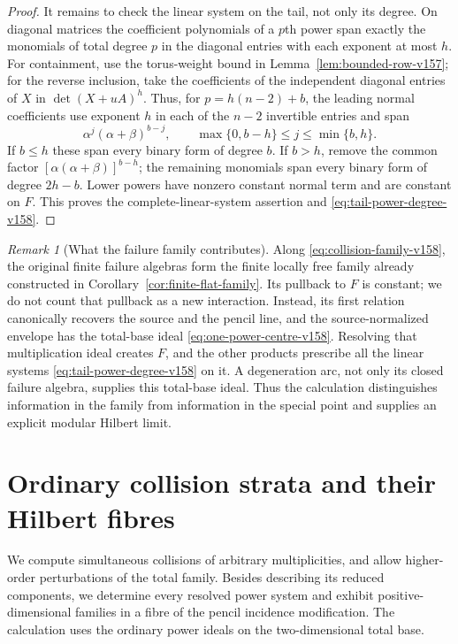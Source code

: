 \documentclass[11pt,reqno]{amsart}
\numberwithin{equation}{section}
\theoremstyle{definition}\newtheorem{definition}[theorem]{Definition}
\theoremstyle{remark}\newtheorem{remark}[theorem]{Remark}
\begin{document}
\begin{proof}
It remains to check the linear system on the tail, not only its
degree. On diagonal matrices the coefficient polynomials of a $p$th
power span exactly the monomials of total degree $p$ in the diagonal
entries with each exponent at most $h$. For containment, use the
torus-weight bound in Lemma~\ref{lem:bounded-row-v157}; for the reverse
inclusion, take the coefficients of the independent diagonal entries
of $X$ in $\det(X+uA)^h$. Thus, for $p=h(n-2)+b$, the leading normal
coefficients use exponent $h$ in each of the $n-2$ invertible entries
and span
\[
  \alpha^j(\alpha+\beta)^{b-j},\qquad
           \max\{0,b-h\}\leq j\leq\min\{b,h\}.
\]
If $b\leq h$ these span every
binary form of degree $b$. If $b>h$, remove the common factor
$[\alpha(\alpha+\beta)]^{b-h}$; the remaining monomials span every binary form of
degree $2h-b$. Lower powers have nonzero constant normal term and
are constant on $F$. This proves the complete-linear-system assertion
and \eqref{eq:tail-power-degree-v158}.
\end{proof}

\begin{remark}[What the failure family contributes]
\label{rem:tail-integration-v158}
Along \eqref{eq:collision-family-v158}, the original finite failure
algebras form the finite locally free family already constructed in
Corollary~\ref{cor:finite-flat-family}. Its pullback to $F$ is constant;
we do not count that pullback as a new interaction. Instead, its first
relation canonically recovers the source and the pencil line, and the
source-normalized envelope has the total-base ideal
\eqref{eq:one-power-centre-v158}. Resolving that multiplication ideal
creates $F$, and the other products prescribe all the linear systems
\eqref{eq:tail-power-degree-v158} on it. A degeneration arc, not only
its closed failure algebra, supplies this total-base ideal. Thus the
calculation distinguishes information in the family from information
in the special point and supplies an explicit modular Hilbert limit.
\end{remark}


\section{Ordinary collision strata and their Hilbert fibres}
\label{sec:ordinary-collisions-v159}
We compute simultaneous collisions of arbitrary multiplicities, and
allow higher-order perturbations of the total family. Besides describing
its reduced components, we determine every resolved power system and
exhibit positive-dimensional families in a fibre of the pencil
incidence modification. The calculation uses the ordinary power ideals
on the two-dimensional total base.
\end{document}
